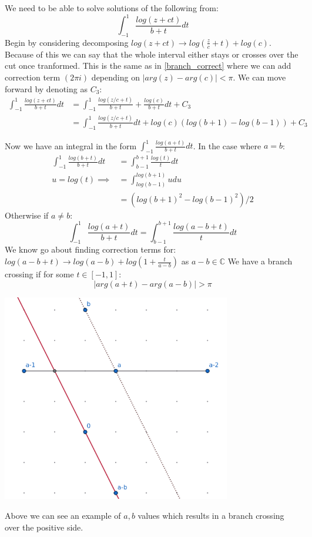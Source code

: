 \documentclass{article}
\begin{document}
We need to be able to solve solutions of the following from:
$$\int_{-1}^1\frac{log(z+ct)}{b+t}dt$$
Begin by considering decomposing $log(z+ct)\rightarrow log(\frac{z}{c}+t)+log(c)$.
Because of this we can say that the whole interval either stays or crosses over the cut once tranformed.
This is the same as in \eqref{branch_correct} where we can add correction term $(2\pi i)$ depending on $|arg(z)-arg(c)|<\pi$.
We can move forward by denoting as $C_3$:
\begin{align}
    \int_{-1}^1\frac{log(z+ct)}{b+t}dt&=\int_{-1}^1\frac{log(z/c+t)}{b+t}+\frac{log(c)}{b+t}dt+C_3\\
    &=\int_{-1}^1\frac{log(z/c+t)}{b+t}dt+log(c)(log(b+1)-log(b-1))+C_3
\end{align}

Now we have an integral in the form $\int_{-1}^1\frac{log(a+t)}{b+t}dt$.
In the case where $a=b$:
\begin{align}
    \int_{-1}^1\frac{log(b+t)}{b+t}dt&=\int_{b-1}^{b+1}\frac{log(t)}{t}dt\\
    u = log(t) \implies &= \int_{log(b-1)}^{log(b+1)}udu\\
    &=(log(b+1)^2-log(b-1)^2)/2
\end{align}
Otherwise if $a\neq b$:
$$\int_{-1}^1\frac{log(a+t)}{b+t}dt=\int_{b-1}^{b+1}\frac{log(a-b+t)}{t}dt$$
We know go about finding correction terms for: $log(a-b+t)\rightarrow log(a-b)+log(1+\frac{t}{a-b})$ as $a-b\in\mathbb{C}$
We have a branch crossing if for some $t\in[-1,1]$:
$$|arg(a+t)-arg(a-b)|>\pi$$
\begin{center}\includegraphics[width=0.75\textwidth]{s00}\end{center}
Above we can see an example of $a,b$ values which results in a branch crossing over the positive side.
\end{document}
